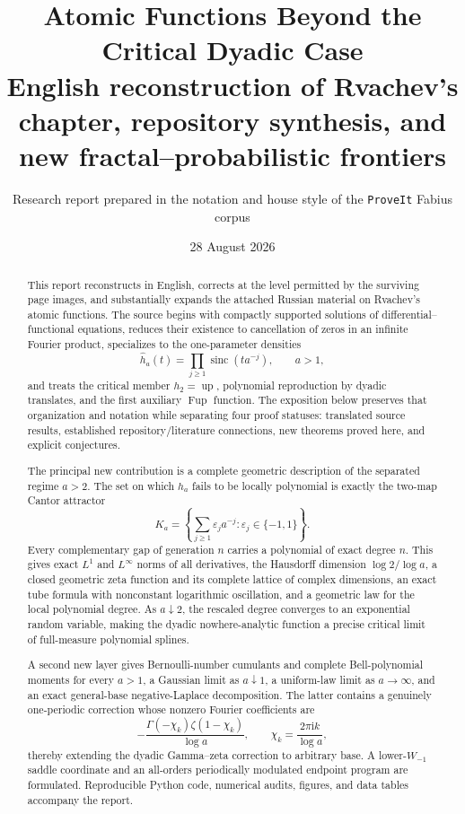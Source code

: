 \documentclass[11pt,oneside]{article}
\title{\bfseries Atomic Functions Beyond the Critical Dyadic Case\\[0.35em]
\large English reconstruction of Rvachev's chapter, repository synthesis, and new fractal--probabilistic frontiers}
\author{Research report prepared in the notation and house style of the \texttt{ProveIt} Fabius corpus}
\date{28 August 2026}
\theoremstyle{definition}
\theoremstyle{remark}
\newcommand{\Up}{\operatorname{up}}
\newcommand{\sinc}{\operatorname{sinc}}
\newcommand{\ii}{\mathrm i}
\newcommand{\eps}{\varepsilon}
\begin{document}
\maketitle

\begin{abstract}
This report reconstructs in English, corrects at the level permitted by the surviving page images, and substantially expands the attached Russian material on Rvachev's atomic functions.  The source begins with compactly supported solutions of differential--functional equations, reduces their existence to cancellation of zeros in an infinite Fourier product, specializes to the one-parameter densities
\[
 \widehat h_a(t)=\prod_{j\ge1}\sinc(t a^{-j}),\qquad a>1,
\]
and treats the critical member $h_2=\Up$, polynomial reproduction by dyadic translates, and the first auxiliary $\operatorname{Fup}$ function.  The exposition below preserves that organization and notation while separating four proof statuses: translated source results, established repository/literature connections, new theorems proved here, and explicit conjectures.

The principal new contribution is a complete geometric description of the separated regime $a>2$.  The set on which $h_a$ fails to be locally polynomial is exactly the two-map Cantor attractor
\[
 K_a=\left\{\sum_{j\ge1}\eps_j a^{-j}:\eps_j\in\{-1,1\}\right\}.
\]
Every complementary gap of generation $n$ carries a polynomial of exact degree $n$.  This gives exact $L^1$ and $L^\infty$ norms of all derivatives, the Hausdorff dimension $\log2/\log a$, a closed geometric zeta function and its complete lattice of complex dimensions, an exact tube formula with nonconstant logarithmic oscillation, and a geometric law for the local polynomial degree.  As $a\downarrow2$, the rescaled degree converges to an exponential random variable, making the dyadic nowhere-analytic function a precise critical limit of full-measure polynomial splines.

A second new layer gives Bernoulli-number cumulants and complete Bell-polynomial moments for every $a>1$, a Gaussian limit as $a\downarrow1$, a uniform-law limit as $a\to\infty$, and an exact general-base negative-Laplace decomposition.  The latter contains a genuinely one-periodic correction whose nonzero Fourier coefficients are
\[
 -\frac{\Gamma(-\chi_k)\zeta(1-\chi_k)}{\log a},\qquad
 \chi_k=\frac{2\pi\ii k}{\log a},
\]
thereby extending the dyadic Gamma--zeta correction to arbitrary base.  A lower-$W_{-1}$ saddle coordinate and an all-orders periodically modulated endpoint program are formulated.  Reproducible Python code, numerical audits, figures, and data tables accompany the report.
\end{abstract}
\end{document}
